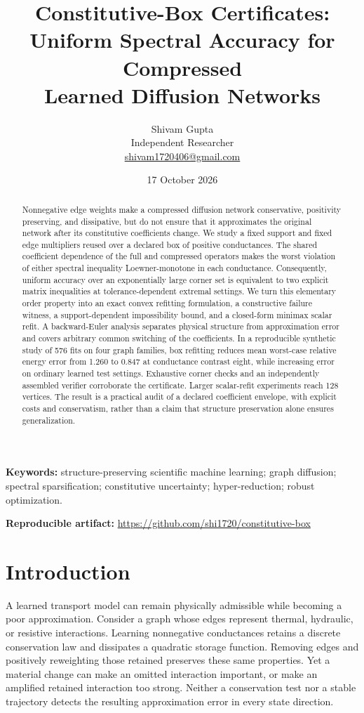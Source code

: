 \documentclass[11pt]{article}
\title{Constitutive-Box Certificates:\\Uniform Spectral Accuracy for Compressed\\Learned Diffusion Networks}
\author{Shivam Gupta\\Independent Researcher\\\href{mailto:shivam1720406@gmail.com}{shivam1720406@gmail.com}}
\date{17 October 2026}
\begin{document}
\maketitle
\begin{abstract}
Nonnegative edge weights make a compressed diffusion network conservative, positivity preserving, and dissipative, but do not ensure that it approximates the original network after its constitutive coefficients change. We study a fixed support and fixed edge multipliers reused over a declared box of positive conductances. The shared coefficient dependence of the full and compressed operators makes the worst violation of either spectral inequality Loewner-monotone in each conductance. Consequently, uniform accuracy over an exponentially large corner set is equivalent to two explicit matrix inequalities at tolerance-dependent extremal settings. We turn this elementary order property into an exact convex refitting formulation, a constructive failure witness, a support-dependent impossibility bound, and a closed-form minimax scalar refit. A backward-Euler analysis separates physical structure from approximation error and covers arbitrary common switching of the coefficients. In a reproducible synthetic study of 576 fits on four graph families, box refitting reduces mean worst-case relative energy error from 1.260 to 0.847 at conductance contrast eight, while increasing error on ordinary learned test settings. Exhaustive corner checks and an independently assembled verifier corroborate the certificate. Larger scalar-refit experiments reach 128 vertices. The result is a practical audit of a declared coefficient envelope, with explicit costs and conservatism, rather than a claim that structure preservation alone ensures generalization.
\end{abstract}
\noindent\textbf{Keywords:} structure-preserving scientific machine learning; graph diffusion; spectral sparsification; constitutive uncertainty; hyper-reduction; robust optimization.

\medskip\noindent\textbf{Reproducible artifact:} \url{https://github.com/shi1720/constitutive-box}

\section{Introduction}
A learned transport model can remain physically admissible while becoming a poor approximation. Consider a graph whose edges represent thermal, hydraulic, or resistive interactions. Learning nonnegative conductances retains a discrete conservation law and dissipates a quadratic storage function. Removing edges and positively reweighting those retained preserves these same properties. Yet a material change can make an omitted interaction important, or make an amplified retained interaction too strong. Neither a conservation test nor a stable trajectory detects the resulting approximation error in every state direction.
\end{document}

